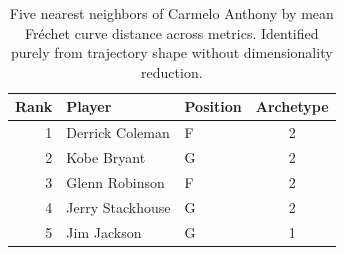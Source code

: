 \begin{table}[htbp]
  \centering\small
  \begin{tabular}{rllc}
    \toprule
    Rank & Player & Position & Archetype \\
    \midrule
    1 & Derrick Coleman & F & 2 \\
    2 & Kobe Bryant & G & 2 \\
    3 & Glenn Robinson & F & 2 \\
    4 & Jerry Stackhouse & G & 2 \\
    5 & Jim Jackson & G & 1 \\
    \bottomrule
  \end{tabular}
  \caption{Five nearest neighbors of Carmelo Anthony by mean Fr\'{e}chet curve distance across metrics. Identified purely from trajectory shape without dimensionality reduction.}
  \label{tab:Carmelo_Anthony_frechet_curve_neighbors}
\end{table}

